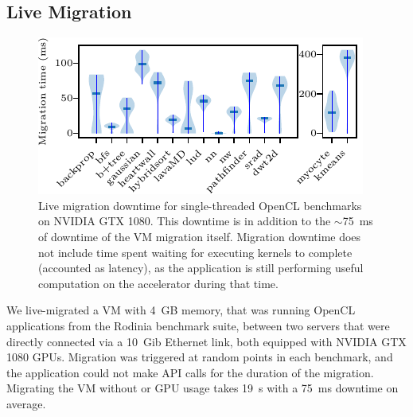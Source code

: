 \subsection{Live Migration}

\begin{figure}
	\centering
	\includegraphics[width=\columnwidth]{ava/data/migration/time_plot.pdf}%
	\caption{Live migration downtime for single-threaded OpenCL benchmarks on NVIDIA GTX 1080.
      This downtime is in addition to the $\sim$\SI{75}{\milli\second} of downtime of the VM migration itself.
      Migration downtime does not include time spent waiting for executing kernels to complete (accounted as latency), as the application is still performing useful computation on the accelerator during that time.
    }
	\label{fig:migration}
\end{figure}

We live-migrated a VM with 4~GB memory, that was running OpenCL applications from the Rodinia benchmark suite, between two servers that were directly connected via a 10~Gib Ethernet link, both equipped with NVIDIA GTX 1080 GPUs.
Migration was triggered at random points in each benchmark, and the application could not make API calls for the duration of the migration.
Migrating the VM without \AvA or GPU usage takes \SI{19}{\second} with a \SI{75}{\milli\second} downtime on average.

